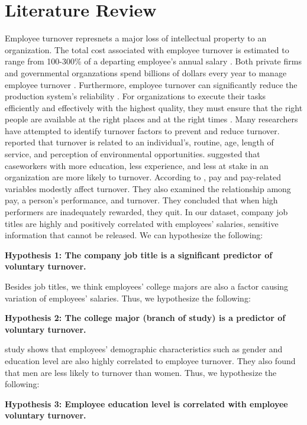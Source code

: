 \section{Literature Review}
Employee turnover represnets a major loss of intellectual property to an organization. The total cost associated with employee turnover is estimated to range from 100-300\% of a departing employee's annual salary \citep{Moody2000}. Both private firms and governmental organzations spend billions of dollars every year to manage employee turnover \citep{leonard2001}. Furthermore, employee turnover can significantly reduce the production system's reliability \citep{ahmad2014, sawhney2010}. For organizations to execute their tasks efficiently and effectively with the highest quality, they must ensure that the right people are available at the right places and at the right times \citep{khoong1996}. 
Many researchers have attempted to identify turnover factors to prevent and reduce turnover. \citet{bluedorn1982} reported that turnover is related to an individual's, routine, age, length of service, and perception of environmental opportunities. \citet{balfour1993} suggested that caseworkers with more education, less experience, and less at stake in an organization are more likely to turnover. According to \citet{griffeth2000}, pay and pay-related variables modestly affect turnover. They also examined the relationship among pay, a person's performance, and turnover. They concluded that when high performers are inadequately rewarded, they quit. In our dataset, company job titles are highly and positively correlated with employees' salaries, sensitive information that cannot be released. We can hypothesize the following:

\textbf{Hypothesis 1: The company job title is a significant predictor of voluntary turnover.}

Besides job titles, we think employees' college majors are also a factor causing variation of employees' salaries. Thus, we hypothesize the following:

\textbf{Hypothesis 2: The college major (branch of study) is a predictor of voluntary turnover. }

\citet{griffeth2000} study shows that employees' demographic characteristics such as gender and education level are also highly correlated to employee turnover. They also found that men are less likely to turnover than women. Thus, we hypothesize the following:

\textbf{Hypothesis 3: Employee education level is correlated with employee voluntary turnover.}



